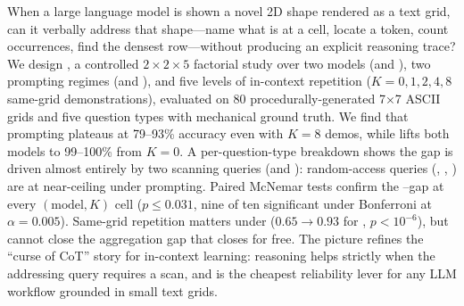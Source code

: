 When a large language model is shown a novel 2D shape rendered as a text
grid, can it verbally address that shape---name what is at a cell, locate a
token, count occurrences, find the densest row---without producing an
explicit reasoning trace? We design \addrtask, a controlled
$2{\times}2{\times}5$ factorial study over two models (\gpt and \haiku), two
prompting regimes (\Direct and \COT), and five levels of in-context
repetition ($K{=}0,1,2,4,8$ same-grid demonstrations), evaluated on 80
procedurally-generated 7$\times$7 ASCII grids and five question types with
mechanical ground truth.
We find that \Direct prompting plateaus at 79--93\% accuracy even with
$K{=}8$ demos, while \COT lifts both models to 99--100\% from $K{=}0$.
A per-question-type breakdown shows the gap is driven almost entirely by
two scanning queries (\qcount and \qrowmax): random-access queries
(\qpoint, \qlookup, \qneighbor) are at near-ceiling under \Direct prompting.
Paired McNemar tests confirm the \Direct--\COT gap at every $(\text{model},
K)$ cell ($p{\le}0.031$, nine of ten significant under Bonferroni at
$\alpha{=}0.005$). Same-grid repetition matters under \Direct
($0.65 \to 0.93$ for \haiku, $p{<}10^{-6}$), but cannot close the
aggregation gap that \COT closes for free. The picture refines the
``curse of CoT'' story for in-context learning: reasoning helps strictly
when the addressing query requires a scan, and is the cheapest reliability
lever for any LLM workflow grounded in small text grids.
